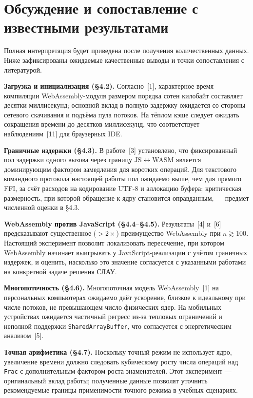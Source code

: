 \documentclass[12pt, oneside]{book}
\begin{document}
\section{Обсуждение и сопоставление с известными результатами}
\label{sec:exp_discussion}

    \quad Полная интерпретация будет приведена после получения количественных данных. Ниже зафиксированы ожидаемые качественные выводы и точки сопоставления с литературой.

    \quad \textbf{Загрузка и инициализация (§4.2).} Согласно~[1], характерное время компиляции WebAssembly-модуля размером порядка сотен килобайт составляет десятки миллисекунд; основной вклад в полную задержку ожидается со стороны сетевого скачивания и подъёма пула потоков. На тёплом кэше следует ожидать сокращения времени до десятков миллисекунд, что соответствует наблюдениям~[11] для браузерных IDE.

    \quad \textbf{Граничные издержки (§4.3).} В работе~[3] установлено, что фиксированный пол задержки одного вызова через границу JS$\leftrightarrow$WASM является доминирующим фактором замедления для коротких операций. Для текстового командного протокола настоящей работы пол ожидаемо выше, чем для прямого FFI, за счёт расходов на кодирование UTF-8 и аллокацию буфера; критическая размерность, при которой обращение к ядру становится оправданным, --- предмет численной оценки в §4.3.

    \quad \textbf{WebAssembly против JavaScript (§4.4--§4.5).} Результаты~[4] и~[6] предсказывают существенное ($> 2\times$) преимущество WebAssembly при $n \gtrsim 100$. Настоящий эксперимент позволит локализовать пересечение, при котором WebAssembly начинает выигрывать у JavaScript-реализации с учётом граничных издержек, и оценить, насколько это значение согласуется с указанными работами на конкретной задаче решения СЛАУ.

    \quad \textbf{Многопоточность (§4.6).} Многопоточная модель WebAssembly~[1] на персональных компьютерах ожидаемо даёт ускорение, близкое к идеальному при числе потоков, не превышающем число физических ядер. На мобильных устройствах ожидается частичный регресс из-за тепловых ограничений и неполной поддержки \texttt{SharedArrayBuffer}, что согласуется с энергетическим анализом~[5].

    \quad \textbf{Точная арифметика (§4.7).} Поскольку точный режим не использует ядро, увеличение времени должно следовать кубическому росту числа операций над \texttt{Frac} с дополнительным фактором роста знаменателей. Этот эксперимент --- оригинальный вклад работы; полученные данные позволят уточнить рекомендуемые границы применимости точного режима в учебных сценариях.
\end{document}
